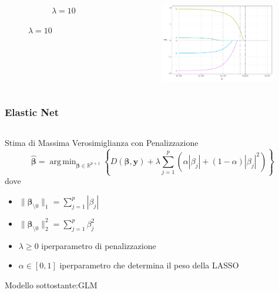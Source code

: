 \documentclass[pdf, aspectratio=169]{beamer}\usepackage[]{graphicx}\usepackage[]{color}
\DeclareMathOperator*{\argmin}{arg\,min}  %
\theoremstyle{definition}
\begin{document}
\begin{frame}
\begin{columns}[c]
\begin{column}{0.55\linewidth}
\begin{figure}
\begin{subfigure}[b]{3cm}
      \caption{$\lambda = 10$}
    \end{subfigure}
  \end{figure}
\end{column}
\begin{column}{0.45\linewidth}
  \begin{figure}
    \centering
    \includegraphics[width=5cm]{_bookdown_files/_main_files/figure-latex/lasso-lambda-5.pdf}
  \end{figure}
\end{column}
\end{columns}

\end{frame}

\begin{frame}
\frametitle{Elastic Net}

\begin{columns}
\begin{column}{0.8\linewidth}
  \begin{block}{Stima di Massima Verosimiglianza con Penalizzazione}
    $$
    \hat{\boldsymbol{\beta}} = \argmin_{\boldsymbol{\beta}\in\mathbb{R}^{p+1}}{\left\{
    D(\boldsymbol{\beta}, \boldsymbol{y}) +
    \lambda 
    \sum_{j=1}^p{\left(\alpha |\beta_j| + (1 - \alpha) |\beta_j|^2\right)}
    \right\}}
    $$
    dove
    \begin{itemize}
      \item $\|\boldsymbol{\beta}_{\setminus0}\|_1 = \sum_{j=1}^p{|\beta_j|}$
      \item $\|\boldsymbol{\beta}_{\setminus0}\|_2^2 = \sum_{j=1}^p{\beta_j^2}$
      \item $\lambda\ge0$ iperparametro di penalizzazione
      \item $\alpha \in [0,1]$ iperparametro che determina il peso della LASSO
    \end{itemize}
    
    \vspace{0.2cm}
    
    Modello sottostante:GLM
  \end{block}
\end{column}
\end{columns}

\end{frame}
\end{document}
